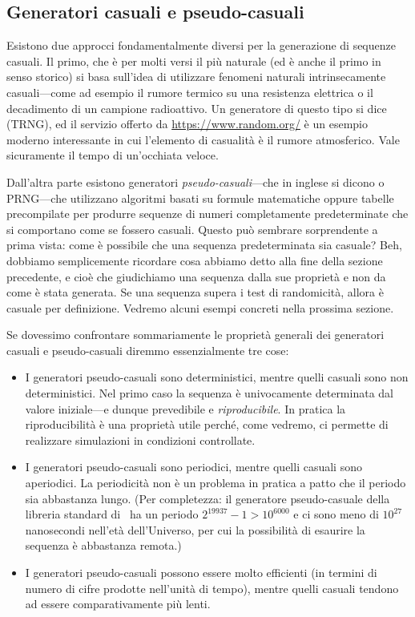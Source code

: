 \subsection{Generatori casuali e pseudo-casuali}

Esistono due approcci fondamentalmente diversi per la generazione di
sequenze casuali. Il primo, che è per molti versi il più naturale (ed è
anche il primo in senso storico) si basa sull'idea di utilizzare fenomeni
naturali intrinsecamente casuali---come ad esempio il rumore termico su una
resistenza elettrica o il decadimento di un campione radioattivo. Un generatore
di questo tipo si dice  (TRNG), ed il
servizio offerto da \url{https://www.random.org/} è un esempio moderno
interessante in cui l'elemento di casualità è il rumore atmosferico.
Vale sicuramente il tempo di un'occhiata veloce.

Dall'altra parte esistono generatori \emph{pseudo-casuali}---che in inglese si
dicono  o PRNG---che utilizzano algoritmi
basati su formule matematiche oppure tabelle precompilate per produrre sequenze
di numeri completamente predeterminate che si comportano come se fossero
casuali. Questo può sembrare sorprendente a prima vista: come è possibile
che una sequenza predeterminata sia casuale? Beh, dobbiamo semplicemente
ricordare cosa abbiamo detto alla fine della sezione precedente, e cioè che
giudichiamo una sequenza dalla sue proprietà e non da come è stata
generata. Se una sequenza supera i test di randomicità, allora è casuale
per definizione. Vedremo alcuni esempi concreti nella prossima sezione.

Se dovessimo confrontare sommariamente le proprietà generali dei generatori
casuali e pseudo-casuali diremmo essenzialmente tre cose:
\begin{itemize}
\item I generatori pseudo-casuali sono deterministici, mentre quelli casuali
  sono non deterministici. Nel primo caso la sequenza è univocamente
  determinata dal valore iniziale---e dunque prevedibile e \emph{riproducibile}.
  In pratica la riproducibilità è una proprietà utile perché, come
  vedremo, ci permette di realizzare simulazioni in condizioni controllate.
\item I generatori pseudo-casuali sono periodici, mentre quelli casuali sono
  aperiodici. La periodicità non è un problema in pratica a patto che il
  periodo sia abbastanza lungo. (Per completezza: il generatore pseudo-casuale
  della libreria standard di \python\ ha un periodo $2^{19937} - 1 > 10^{6000}$
  e ci sono meno di $10^{27}$ nanosecondi nell'età dell'Universo, per cui
  la possibilità di esaurire la sequenza è abbastanza remota.)
\item I generatori pseudo-casuali possono essere molto efficienti (in termini
  di numero di cifre prodotte nell'unità di tempo), mentre quelli casuali
  tendono ad essere comparativamente più lenti.
\end{itemize}

